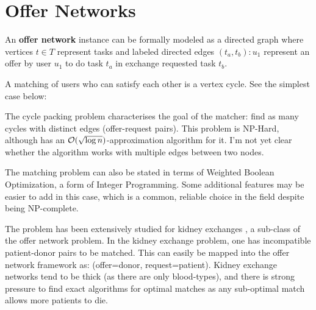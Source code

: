 \documentclass[main.tex]{subfiles}
\begin{document}
\section{Offer Networks}
An \textbf{offer network} instance can be formally modeled as a directed graph where vertices $t \in T$ represent tasks and labeled directed edges $(t_a,t_b) : u_1$ represent an offer by user $u_1$ to do task $t_a$ in exchange requested task $t_b$.
\begin{center}
\end{center}

A matching of users who can satisfy each other is a vertex cycle. See the simplest case below:

\begin{center}
\end{center}

The cycle packing problem \cite{Kri} characterises the goal of the matcher: find as many cycles with distinct edges (offer-request pairs). This problem is NP-Hard, although \cite{Kri} has an $\mathcal{O}(\sqrt{\log n})$-approximation algorithm for it. I'm not yet clear whether the algorithm works with multiple edges between two nodes.

The matching problem can also be stated in terms of Weighted Boolean Optimization, a form of Integer Programming. Some additional features may be easier to add in this case, which is a common, reliable choice in the field despite being NP-complete.

The problem has been extensively studied for kidney exchanges \cite{Bir}, a sub-class of the offer network problem. In the kidney exchange problem, one has incompatible patient-donor pairs to be matched. This can easily be mapped into the offer network framework as: (offer=donor, request=patient). Kidney exchange networks tend to be thick (as there are only blood-types), and there is strong pressure to find exact algorithms for optimal matches as any sub-optimal match allows more patients to die.
\end{document}
